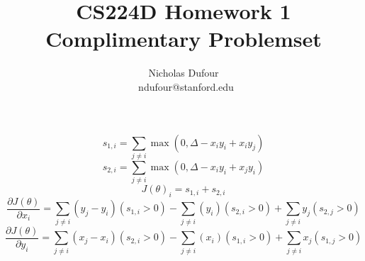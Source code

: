 \documentclass{article}[12pt]
\title{CS224D Homework 1 \\ Complimentary Problemset}
\author{Nicholas Dufour \\\ ndufour@stanford.edu}
\begin{document}
$$s_{1,i} = \sum_{j \not= i}\max(0, \Delta - x_i y_i + x_i y_j)$$
$$s_{2,i} = \sum_{j \not= i}\max(0, \Delta - x_i y_i + x_j y_i)$$
$$J(\theta)_i = s_{1,i} + s_{2,i}$$
$$\frac{\partial J(\theta)}{\partial x_i} = \sum_{j \not=i} (y_j-y_i) (s_{1,i} > 0) - \sum_{j \not= i} (y_i) (s_{2,i} > 0) + \sum_{j\not= i} y_j (s_{2,j}>0)$$
$$\frac{\partial J(\theta)}{\partial y_i} = \sum_{j \not= i} (x_j-x_i) (s_{2,i} > 0)  - \sum_{j \not=i} (x_i) (s_{1,i} > 0) + \sum_{j\not= i} x_j (s_{1,j}>0)$$
\end{document}
